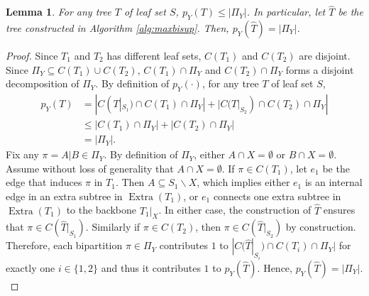 \documentclass{bmcart}
\DeclareMathOperator*{\extra}{Extra}
\newtheorem{lemma}{Lemma}
\begin{document}
\begin{lemma}\label{lem:max_pY}
    For any tree $T$ of leaf set $S$, $p_Y(T) \le |\Pi_Y|$. In particular, let $\hat{T}$ be the tree constructed in Algorithm \ref{alg:maxbisup}. Then, $p_Y(\hat{T}) = |\Pi_Y|$. 
\end{lemma}
\begin{proof}
    Since $T_1$ and $T_2$ has different leaf sets, $C(T_1)$ and $C(T_2)$ are disjoint. Since $\Pi_Y \subseteq C(T_1)\cup C(T_2)$, $C(T_1) \cap \Pi_Y$ and $C(T_2)\cap \Pi_Y$ forms a disjoint decomposition of $\Pi_Y$. By definition of $p_Y(\cdot)$, for any tree $T$ of leaf set $S$,
    \begin{align*}
        p_Y(T) &= |C(T|_{S_1}) \cap C(T_1) \cap \Pi_Y| + |C(T|_{S_2}) \cap C(T_2) \cap \Pi_Y| \\
        &\le |C(T_1) \cap \Pi_Y| + | C(T_2) \cap \Pi_Y| \\
        &= |\Pi_Y|.
    \end{align*}
    Fix any $\pi = A|B \in \Pi_Y$. By definition of $\Pi_Y$, either $A \cap X = \emptyset$ or $B \cap X = \emptyset$. Assume without loss of generality that $A \cap X = \emptyset$. If $\pi \in C(T_1)$, let $e_1$ be the edge that induces $\pi$ in $T_1$. Then $A \subseteq S_1 \backslash X$, which implies either $e_1$ is an internal edge in an extra subtree in $\extra(T_1)$, or $e_1$ connects one extra subtree in $\extra(T_1)$ to the backbone $T_1|_X$. In either case, the construction of $\hat{T}$ ensures that $\pi \in C(\hat{T}|_{S_1})$. Similarly if $\pi \in C(T_2)$, then $\pi \in C(\hat{T}|_{S_2})$ by construction. Therefore, each bipartition $\pi \in \Pi_Y$ contributes $1$ to $|C(\hat{T}|_{S_i}) \cap C(T_i) \cap \Pi_Y|$ for exactly one $i \in \{1,2\}$ and thus it contributes $1$ to $p_Y(\hat{T})$. Hence, $p_Y(\hat{T}) = |\Pi_Y|$.\\
\end{proof}
\end{document}
